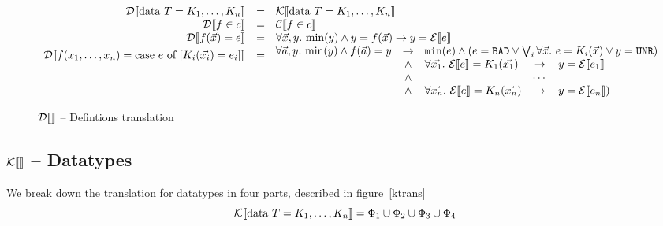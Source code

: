\documentclass[preprint]{sigplanconf}
\begin{document}
\begin{figure}
\[
\begin{array}{rcl}
  \dtrans{\mbox{data } T = K_1, \dots, K_n} &=& \ktrans{\mbox{data } T = K_1, \dots, K_n} \\
  \dtrans{f \in c} &=& \ctrans{f \in c} \\
  \dtrans{f(\vec{x}) = e} &=& \forall \vec{x},y.~ \min{y} \land y =
  f(\vec{x}) \to y = \etrans{e} \\
   \raisebox{ 0.5 cm }{$\dtrans{f(x_1,\dots,x_n) = \mbox{case } e \mbox{ of } [K_i(\vec{x_i}) = e_i]}$} &\raisebox{0.5cm}{=}&  \hspace{-0.18cm} \begin{array}{rclcl}
     \forall \vec{a},y.~\mbox{min}(y) \land f(\vec{a}) = y &\rightarrow&
     \multicolumn{3}{c}{  \texttt{min}(e) \land (e = \texttt{BAD} \lor
       \bigvee_i \forall \vec{x}.~e = K_i(\vec{x}) \lor y = \texttt{UNR})} \\
     &\land& \forall \vec{x_1}.~\etrans{e} = K_1(\vec{x_1}) &\to& y = \etrans{e_1} \\
     &\land& & \cdots & \\
     &\land& \forall \vec{x_n}.~\etrans{e} = K_n(\vec{x_n}) &\to& y = \etrans{e_n}) \\
   \end{array} 
\end{array}
\]
\caption{$\mathcal{D} \llbracket  \rrbracket$ -- Defintions translation}
 \label{dtrans}
\end{figure}



\subsection{$\mathcal{K} \llbracket  \rrbracket$ -- Datatypes}
We break down the translation for datatypes in four parts, described in figure~\ref{ktrans}
$$\mathcal{K} \llbracket \mbox{data } T = K_1, \dots, K_n \rrbracket = \Phi_1 \cup \Phi_2 \cup \Phi_3 \cup \Phi_4$$
\end{document}
